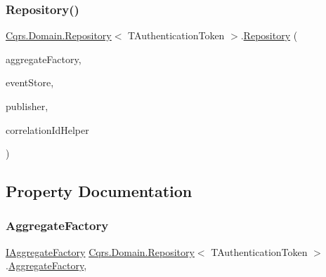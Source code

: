 \subsubsection{\texorpdfstring{Repository()}{Repository()}}
{\footnotesize\ttfamily \hyperlink{classCqrs_1_1Domain_1_1Repository}{Cqrs.\+Domain.\+Repository}$<$ T\+Authentication\+Token $>$.\hyperlink{classCqrs_1_1Domain_1_1Repository}{Repository} (\begin{DoxyParamCaption}\item[{\hyperlink{interfaceCqrs_1_1Domain_1_1Factories_1_1IAggregateFactory}{I\+Aggregate\+Factory}}]{aggregate\+Factory,  }\item[{\hyperlink{interfaceCqrs_1_1Events_1_1IEventStore}{I\+Event\+Store}$<$ T\+Authentication\+Token $>$}]{event\+Store,  }\item[{\hyperlink{interfaceCqrs_1_1Events_1_1IEventPublisher}{I\+Event\+Publisher}$<$ T\+Authentication\+Token $>$}]{publisher,  }\item[{I\+Correlation\+Id\+Helper}]{correlation\+Id\+Helper }\end{DoxyParamCaption})}



\subsection{Property Documentation}
\mbox{\label{classCqrs_1_1Domain_1_1Repository_a02cee15b1d3f603c1ae437b366e83085}} 
\subsubsection{\texorpdfstring{Aggregate\+Factory}{AggregateFactory}}
{\footnotesize\ttfamily \hyperlink{interfaceCqrs_1_1Domain_1_1Factories_1_1IAggregateFactory}{I\+Aggregate\+Factory} \hyperlink{classCqrs_1_1Domain_1_1Repository}{Cqrs.\+Domain.\+Repository}$<$ T\+Authentication\+Token $>$.\hyperlink{classCqrs_1_1Domain_1_1Factories_1_1AggregateFactory}{Aggregate\+Factory}\hspace{0.3cm}{\ttfamily [get]}, {\ttfamily [protected]}}

\mbox{\label{classCqrs_1_1Domain_1_1Repository_a3504ed9a3ff1c689ba89c574619893af}} 
